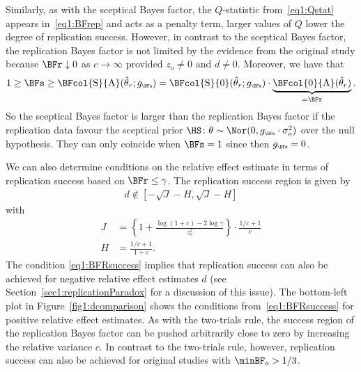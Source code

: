 Similarly, as with the sceptical Bayes factor, the $Q$-statistic
from~\eqref{eq1:Qstat} appears in~\eqref{eq1:BFrep} and acts as a penalty term,
\ie larger values of $Q$ lower the degree of replication success. However, in
contrast to the sceptical Bayes factor, the replication Bayes factor is not
limited by the evidence from the original study because $\BFr \downarrow 0$ as
$c \to \infty$ provided $z_{o} \neq 0$ and $d \neq 0$. Moreover, we have that
\begin{align*}
  1 \geq \BFs \geq \BFcol{\mathrm{S}}{\mathrm{A}}(\hat{\theta}_r; g_{\scriptscriptstyle \BFs})
  = \BFcol{\mathrm{S}}{0}(\hat{\theta}_r; g_{\scriptscriptstyle \BFs}) \cdot \underbrace{\BFcol{0}{\mathrm{A}}(\hat{\theta}_r)}_{= \BFr}.
\end{align*}
So the sceptical Bayes factor is larger than the replication Bayes factor if the
replication data favour the sceptical prior
$\HS \colon \theta \sim \Nor(0, g_{\scriptscriptstyle \BFs} \cdot \sigma^{2}_{o})$
over the null hypothesis. They can only coincide when $\BFs = 1$ since then
$g_{\scriptscriptstyle \BFs} = 0$.

We can also determine conditions on the relative effect estimate in terms of
replication success based on $\BFr \leq \gamma$. The replication success region
is given by
\begin{align}
  \label{eq1:BFRsuccess}
  d \not\in [-\sqrt{J} - H, \sqrt{J} - H]
\end{align}
with
\begin{align*}
  J &= \left\{1 + \frac{\log(1 + c) - 2 \log \gamma}{z_o^2}\right\} \cdot
  \frac{1/c + 1}{c} \\
  H &= \frac{1/c + 1}{1 + c}.
\end{align*}
The condition \eqref{eq1:BFRsuccess} implies that replication success can also be
achieved for negative relative effect estimates $d$ (see
Section~\ref{sec1:replicationParadox} for a discussion of this issue). The
bottom-left plot in Figure~\ref{fig1:dcomparison} shows the conditions
from~\eqref{eq1:BFRsuccess} for positive relative effect estimates. As with the
two-trials rule, the success region of the replication Bayes factor can be
pushed arbitrarily close to zero by increasing the relative variance $c$. In
contrast to the two-trials rule, however, replication success can also be
achieved for original studies with $\minBF_{o} > 1/3$.

